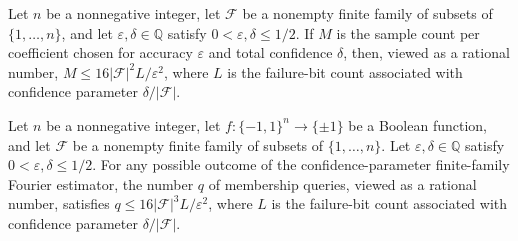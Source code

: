 \begin{theorem}
\label{FABL.queriedFiniteFamilySamplesPerCoefficient_cast_le}
\leanok
{}
Let $n$ be a nonnegative integer, let $\mathcal F$ be a nonempty finite family of
subsets of $\{1,\ldots,n\}$, and let $\varepsilon,\delta\in\mathbb Q$ satisfy
$0<\varepsilon,\delta\le 1/2$. If $M$ is the sample count per coefficient chosen for
accuracy $\varepsilon$ and total confidence $\delta$, then, viewed as a rational number,
$M\le 16|\mathcal F|^2L/\varepsilon^2$, where $L$ is the failure-bit count associated
with confidence parameter $\delta/|\mathcal F|$.
\end{theorem}

\begin{theorem}
\label{FABL.queriedFiniteFamilyFourierEstimatorProgramWithConfidence_queries_cast_le}
\leanok
{}
Let $n$ be a nonnegative integer, let $f:\{-1,1\}^n\to\{\pm1\}$ be a Boolean function,
and let $\mathcal F$ be a nonempty finite family of subsets of $\{1,\ldots,n\}$. Let
$\varepsilon,\delta\in\mathbb Q$ satisfy $0<\varepsilon,\delta\le 1/2$. For any possible
outcome of the confidence-parameter finite-family Fourier estimator, the number $q$ of
membership queries, viewed as a rational number, satisfies $q\le 16|\mathcal F|^3
L/\varepsilon^2$, where $L$ is the failure-bit count associated with confidence
parameter $\delta/|\mathcal F|$.
\end{theorem}

